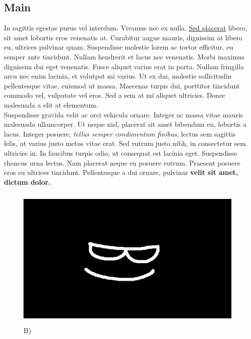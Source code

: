 \documentclass[12pt,a4paper]{article}
\begin{document}
\subsection{Main}
\label{Main}
In sagittis egestas purus vel interdum. Vivamus nec ex nulla. \underline{Sed placerat}  libero, sit amet lobortis eros venenatis at. Curabitur augue mauris, dignissim at libero eu, ultrices pulvinar quam. Suspendisse molestie lorem ac tortor efficitur, eu semper ante tincidunt. Nullam hendrerit et lacus nec venenatis. Morbi maximus dignissim dui eget venenatis. Fusce aliquet varius erat in porta. Nullam fringilla arcu nec enim lacinia, et volutpat mi varius. Ut ex dui, molestie sollicitudin pellentesque vitae, euismod ut massa. Maecenas turpis dui, porttitor tincidunt commodo vel, vulputate vel eros. Sed a sem at mi aliquet ultricies. Donec malesuada a elit at elementum. \\Suspendisse gravida velit ac orci vehicula ornare. Integer ac massa vitae mauris malesuada ullamcorper. Ut neque nisl, placerat sit amet bibendum eu, lobortis a lacus. Integer posuere, \textit{tellus semper condimentum finibus}, lectus sem sagittis felis, ut varius justo metus vitae erat. Sed rutrum justo nibh, in consectetur sem ultricies in. In faucibus turpis odio, ut consequat est lacinia eget. Suspendisse rhoncus urna lectus. Nam placerat neque eu posuere rutrum. Praesent posuere eros eu ultrices tincidunt. Pellentesque a dui ornare, pulvinar  \textbf{velit sit amet, dictum dolor.}

\begin{figure}[H]
\centering
\includegraphics[width=\textwidth, height=7cm]{img1.jpg}
\caption{B)}
\label{fig: image}
\end{figure}
\end{document}
